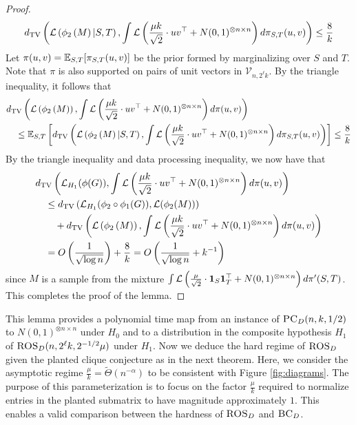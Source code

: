 \begin{proof}
$$d_{\text{TV}}\left( \mathcal{L}\left( \phi_2\left( M \right) | S, T \right), \int \mathcal{L}\left( \frac{\mu k}{\sqrt{2}} \cdot uv^\top + N(0, 1)^{\otimes n \times n} \right) d\pi_{S, T}(u, v)\right) \le \frac{8}{k}$$
Let $\pi(u, v) = \mathbb{E}_{S, T}[\pi_{S,T}(u, v)]$ be the prior formed by marginalizing over $S$ and $T$. Note that $\pi$ is also supported on pairs of unit vectors in $\mathcal{V}_{n, 2^\ell k}$. By the triangle inequality, it follows that
\begin{align*}
&d_{\text{TV}}\left( \mathcal{L}\left( \phi_2\left( M \right) \right), \int \mathcal{L}\left( \frac{\mu k}{\sqrt{2}} \cdot uv^\top + N(0, 1)^{\otimes n \times n} \right) d\pi(u, v) \right) \\
&\quad \le \mathbb{E}_{S, T} \left[ d_{\text{TV}}\left( \mathcal{L}\left( \phi_2\left( M \right) | S, T \right), \int \mathcal{L}\left( \frac{\mu k}{\sqrt{2}} \cdot uv^\top + N(0, 1)^{\otimes n \times n} \right) d\pi_{S, T}(u, v)\right) \right] \le \frac{8}{k}
\end{align*}
By the triangle inequality and data processing inequality, we now have that
\begin{align*}
&d_{\text{TV}}\left( \mathcal{L}_{H_1}(\phi(G)), \int \mathcal{L}\left( \frac{\mu k}{\sqrt{2}} \cdot  uv^\top + N(0, 1)^{\otimes n \times n} \right) d\pi(u, v) \right) \\
&\quad \le d_{\text{TV}}\left( \mathcal{L}_{H_1}(\phi_2 \circ \phi_1(G)), \mathcal{L}(\phi_2(M)) \right) \nonumber\\
&\quad\quad+ d_{\text{TV}}\left( \mathcal{L}\left( \phi_2\left( M \right) \right), \int \mathcal{L}\left( \frac{\mu k}{\sqrt{2}} \cdot uv^\top + N(0, 1)^{\otimes n \times n} \right) d\pi(u, v) \right) \\
&\quad = O\left(\frac{1}{\sqrt{\log n}} \right) + \frac{8}{k} = O\left(\frac{1}{\sqrt{\log n}} + k^{-1} \right)
\end{align*}
since $M$ is a sample from the mixture $\int \mathcal{L}\left(\frac{\mu}{\sqrt{2}} \cdot \mathbf{1}_S \mathbf{1}_T^\top + N(0, 1)^{\otimes n \times n} \right) d\pi'(S, T)$. This completes the proof of the lemma.
\end{proof}

This lemma provides a polynomial time map from an instance of $\textsc{PC}_D(n, k, 1/2)$ to $N(0, 1)^{\otimes n \times n}$ under $H_0$ and to a distribution in the composite hypothesis $H_1$ of $\textsc{ROS}_D(n, 2^\ell k, 2^{-1/2} \mu)$ under $H_1$. Now we deduce the hard regime of $\textsc{ROS}_D$ given the planted clique conjecture as in the next theorem. Here, we consider the asymptotic regime $\frac{\mu}{k} = \tilde{\Theta}(n^{-\alpha})$ to be consistent with Figure \ref{fig:diagrams}. The purpose of this parameterization is to focus on the factor $\frac{\mu}{k}$ required to normalize entries in the planted submatrix to have magnitude approximately $1$. This enables a valid comparison between the hardness of $\textsc{ROS}_D$ and $\textsc{BC}_D$.

